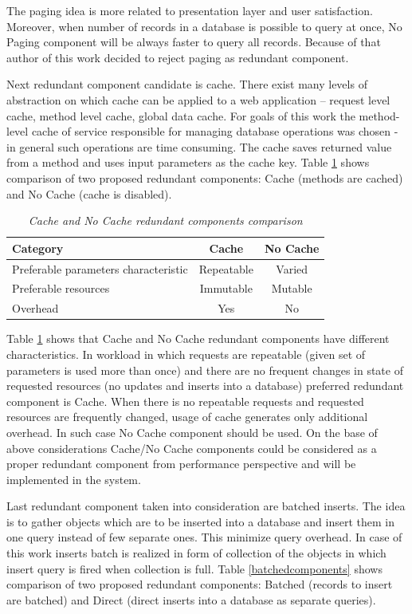 \documentclass[12pt,a4paper]{article}
\begin{document}
The paging idea is more related to presentation layer and user satisfaction. Moreover, when number of records in a database is possible to query at once, No Paging component will be always faster to query all records. Because of that author of this work decided to reject paging as redundant component. 

Next redundant component candidate is cache. There exist many levels of abstraction on which cache can be applied to a web application -- request level cache, method level cache, global data cache. For goals of this work the method-level cache of service responsible for managing database operations was chosen - in general such operations are time consuming. The cache saves returned value from a method and uses input parameters as the cache key. Table \ref{cachecomponents} shows comparison of two proposed redundant components: Cache (methods are cached) and No Cache (cache is disabled).
\begin{table}[!htb]
\begin{center}
\begin{tabular}{l|c|c}
  \textbf{Category} &\textbf{Cache} & \textbf{No Cache} \\
\hline
Preferable parameters characteristic & Repeatable & Varied \\
Preferable resources & Immutable & Mutable\\
Overhead & Yes & No\\
\end{tabular}
\end{center}
\caption{\textit{Cache and No Cache redundant components comparison}}\label{cachecomponents}
\end{table}
 
Table \ref{cachecomponents} shows that Cache and No Cache redundant components have different characteristics. In workload in which requests are repeatable (given set of parameters is used more than once) and there are no frequent changes in state of requested resources (no updates and inserts into a database) preferred redundant component is Cache. When there is no repeatable requests and requested resources are frequently changed, usage of cache generates only additional overhead. In such case No Cache component should be used. On the base of above considerations Cache/No Cache components could be considered as a proper redundant component from performance perspective and will be implemented in the system. 

Last redundant component taken into consideration are batched inserts. The idea is to gather objects which are to be inserted into a database and insert them in one query instead of few separate ones. This minimize query overhead. In case of this work inserts batch is realized in form of collection of the objects in which insert query is fired when collection is full.   
Table \ref{batchedcomponents} shows comparison of two proposed redundant components: Batched (records to insert are batched) and Direct (direct inserts into a database as separate queries).
\end{document}
